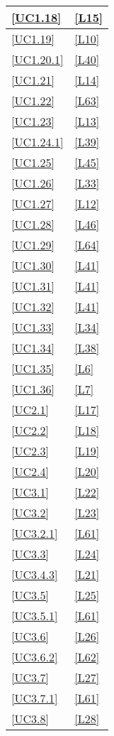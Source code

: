 \begin{longtable}{|P{6cm}|P{6cm}|}
	\hline \ref{UC1.18} & \ref{L15} \\
	\hline \ref{UC1.19} & \ref{L10} \\
	\hline \ref{UC1.20.1} & \ref{L40} \\
	\hline \ref{UC1.21} & \ref{L14} \\
	\hline \ref{UC1.22} & \ref{L63} \\
	\hline \ref{UC1.23} & \ref{L13} \\
	\hline \ref{UC1.24.1} & \ref{L39} \\
	\hline \ref{UC1.25} & \ref{L45} \\
	\hline \ref{UC1.26} & \ref{L33} \\
	\hline \ref{UC1.27} & \ref{L12} \\
	\hline \ref{UC1.28} & \ref{L46} \\
	\hline \ref{UC1.29} & \ref{L64} \\
	\hline \ref{UC1.30} & \ref{L41} \\
	\hline \ref{UC1.31} & \ref{L41} \\
	\hline \ref{UC1.32} & \ref{L41} \\
	\hline \ref{UC1.33} & \ref{L34} \\
	\hline \ref{UC1.34} & \ref{L38} \\
	\hline \ref{UC1.35} & \ref{L6} \\
	\hline \ref{UC1.36} & \ref{L7} \\	
	\hline \ref{UC2.1} & \ref{L17} \\
	\hline \ref{UC2.2} & \ref{L18} \\
	\hline \ref{UC2.3} & \ref{L19} \\
	\hline \ref{UC2.4} & \ref{L20} \\	
	\hline \ref{UC3.1} & \ref{L22} \\
	\hline \ref{UC3.2} & \ref{L23} \\
	\hline \ref{UC3.2.1} & \ref{L61} \\
	\hline \ref{UC3.3} & \ref{L24} \\
	\hline \ref{UC3.4.3} & \ref{L21} \\
	\hline \ref{UC3.5} & \ref{L25} \\
	\hline \ref{UC3.5.1} & \ref{L61} \\
	\hline \ref{UC3.6} & \ref{L26} \\
	\hline \ref{UC3.6.2} & \ref{L62} \\
	\hline \ref{UC3.7} & \ref{L27} \\
	\hline \ref{UC3.7.1} & \ref{L61} \\
	\hline \ref{UC3.8} & \ref{L28} \\

\end{longtable}
